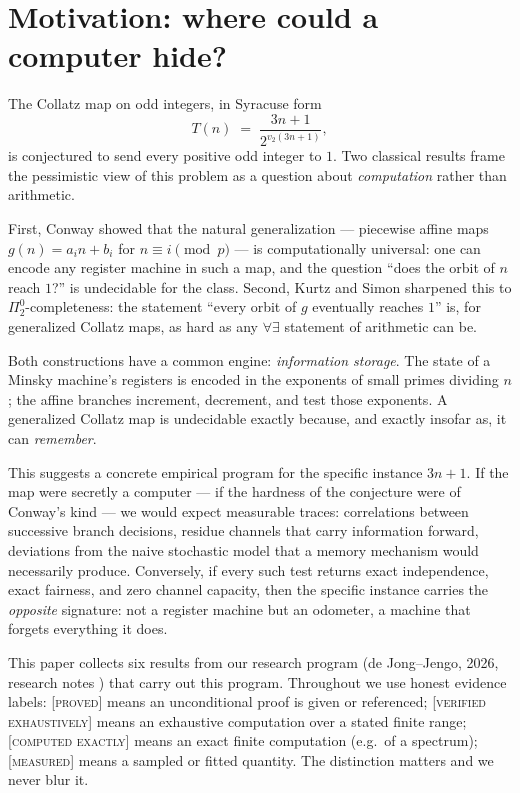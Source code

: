 \documentclass[11pt]{article}
\theoremstyle{definition}
\newcommand{\PROVED}{\textup{[\textsc{proved}]}}
\newcommand{\VERIFIED}{\textup{[\textsc{verified exhaustively}]}}
\newcommand{\COMPUTED}{\textup{[\textsc{computed exactly}]}}
\newcommand{\MEASURED}{\textup{[\textsc{measured}]}}
\newcommand{\vtwo}{v_2}
\begin{document}
\section{Motivation: where could a computer hide?}

The Collatz map on odd integers, in Syracuse form
\[
T(n) \;=\; \frac{3n+1}{2^{\vtwo(3n+1)}},
\]
is conjectured to send every positive odd integer to $1$. Two classical results frame
the pessimistic view of this problem as a question about \emph{computation} rather than
arithmetic.

First, Conway \cite{Conway1972} showed that the natural generalization --- piecewise
affine maps $g(n) = a_i n + b_i$ for $n \equiv i \pmod{p}$ --- is computationally
universal: one can encode any register machine in such a map, and the question ``does
the orbit of $n$ reach $1$?'' is undecidable for the class. Second, Kurtz and Simon
\cite{KurtzSimon2007} sharpened this to $\Pi^0_2$-completeness: the statement ``every
orbit of $g$ eventually reaches $1$'' is, for generalized Collatz maps, as hard as any
$\forall\exists$ statement of arithmetic can be.

Both constructions have a common engine: \emph{information storage}. The state of a
Minsky machine's registers is encoded in the exponents of small primes dividing $n$; the
affine branches increment, decrement, and test those exponents. A generalized Collatz
map is undecidable exactly because, and exactly insofar as, it can \emph{remember}.

This suggests a concrete empirical program for the specific instance $3n+1$. If the
map were secretly a computer --- if the hardness of the conjecture were of Conway's kind
--- we would expect measurable traces: correlations between successive branch decisions,
residue channels that carry information forward, deviations from the naive stochastic
model that a memory mechanism would necessarily produce. Conversely, if every such test
returns exact independence, exact fairness, and zero channel capacity, then the specific
instance carries the \emph{opposite} signature: not a register machine but an odometer,
a machine that forgets everything it does.

This paper collects six results from our research program (de Jong--Jengo, 2026,
research notes \cite{Note2026}) that carry out this program. Throughout we use honest
evidence labels: \PROVED{} means an unconditional proof is given or referenced;
\VERIFIED{} means an exhaustive computation over a stated finite range;
\COMPUTED{} means an exact finite computation (e.g.\ of a spectrum); \MEASURED{} means
a sampled or fitted quantity. The distinction matters and we never blur it.
\end{document}
